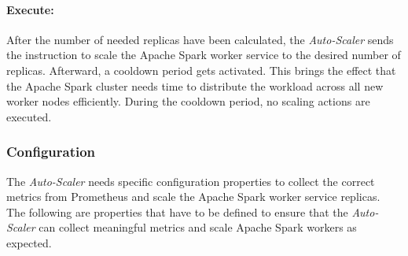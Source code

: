 \paragraph{Execute:}
After the number of needed replicas have been calculated, the \textit{Auto-Scaler} sends the instruction to scale the Apache Spark worker service to the desired number of replicas.
Afterward, a cooldown period gets activated. This brings the effect that the Apache Spark cluster needs time to distribute the workload across all new worker nodes efficiently. During the cooldown period, no scaling actions are executed.


\subsubsection{Configuration}
\label{subsubsec:05_am_auto-scaler_config}
The \textit{Auto-Scaler} needs specific configuration properties to collect the correct metrics from Prometheus and scale the Apache Spark worker service replicas. The following are properties that have to be defined to ensure that the \textit{Auto-Scaler} can collect meaningful metrics and scale Apache Spark workers as expected.

